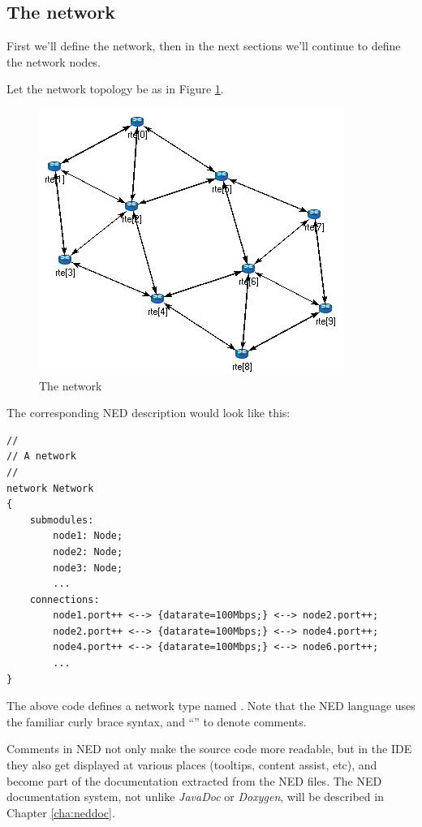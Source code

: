 
\subsection{The network}
\label{sec:ch-ned-lang:warmup:network}

First we'll define the network, then in the next sections we'll continue
to define the network nodes.

Let the network topology be as in Figure \ref{fig:ned-routing-topology}.

\begin{figure}[htbp]
  \centering
  \includegraphics[scale=0.6]{figures/ned-routing-network}
  \caption{The network}
  \label{fig:ned-routing-topology}
\end{figure}

The corresponding NED description would look like this:

\begin{Verbatim}
//
// A network
//
network Network
{
    submodules:
        node1: Node;
        node2: Node;
        node3: Node;
        ...
    connections:
        node1.port++ <--> {datarate=100Mbps;} <--> node2.port++;
        node2.port++ <--> {datarate=100Mbps;} <--> node4.port++;
        node4.port++ <--> {datarate=100Mbps;} <--> node6.port++;
        ...
}
\end{Verbatim}

The above code defines a network type named . Note that the NED
language uses the familiar curly brace syntax, and ``\ttt{//}'' to denote
comments.

\begin{note}
    Comments in NED not only make the source code more readable, but in the
    {\opp} IDE they also get displayed at various places (tooltips, content
    assist, etc), and become part of the documentation extracted from the NED
    files. The NED documentation system, not unlike \textit{JavaDoc} or
    \textit{Doxygen}, will be described in Chapter \ref{cha:neddoc}.
\end{note}

